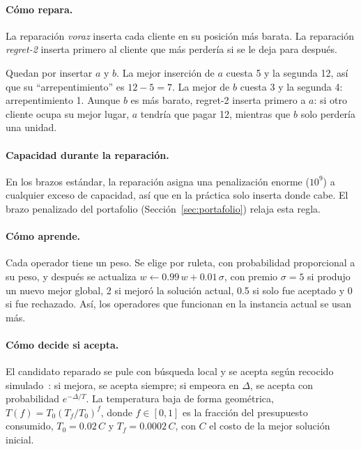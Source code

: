 \documentclass[11pt,a4paper]{article}
\begin{document}
\paragraph{Cómo repara.} La reparación \emph{voraz} inserta cada cliente en su posición más barata.
La reparación \emph{regret-2} inserta primero al cliente que más perdería si se le deja para
después.

\begin{ejemplo}
Quedan por insertar $a$ y $b$. La mejor inserción de $a$ cuesta 5 y la segunda 12, así que su
``arrepentimiento'' es $12-5=7$. La mejor de $b$ cuesta 3 y la segunda 4: arrepentimiento 1. Aunque
$b$ es más barato, regret-2 inserta primero a $a$: si otro cliente ocupa su mejor lugar, $a$ tendría
que pagar 12, mientras que $b$ solo perdería una unidad.
\end{ejemplo}

\paragraph{Capacidad durante la reparación.} En los brazos estándar, la reparación asigna una
penalización enorme ($10^9$) a cualquier exceso de capacidad, así que en la práctica solo inserta
donde cabe. El brazo penalizado del portafolio (Sección~\ref{sec:portafolio}) relaja esta regla.

\paragraph{Cómo aprende.} Cada operador tiene un peso. Se elige por ruleta, con probabilidad
proporcional a su peso, y después se actualiza $w\leftarrow0.99\,w+0.01\,\sigma$, con premio
$\sigma=5$ si produjo un nuevo mejor global, 2 si mejoró la solución actual, 0.5 si solo fue aceptado
y 0 si fue rechazado. Así, los operadores que funcionan en la instancia actual se usan más.

\paragraph{Cómo decide si acepta.} El candidato reparado se pule con búsqueda local y se acepta según
recocido simulado~\cite{kirkpatrick1983}: si mejora, se acepta siempre; si empeora en $\Delta$, se
acepta con probabilidad $e^{-\Delta/T}$. La temperatura baja de forma geométrica,
$T(f)=T_0(T_f/T_0)^f$, donde $f\in[0,1]$ es la fracción del presupuesto consumido, $T_0=0.02\,C$ y
$T_f=0.0002\,C$, con $C$ el costo de la mejor solución inicial.
\end{document}
